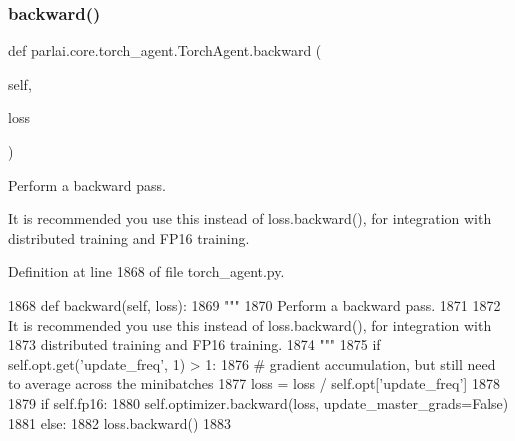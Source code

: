 \subsubsection{\texorpdfstring{backward()}{backward()}}
{\footnotesize\ttfamily def parlai.\+core.\+torch\+\_\+agent.\+Torch\+Agent.\+backward (\begin{DoxyParamCaption}\item[{}]{self,  }\item[{}]{loss }\end{DoxyParamCaption})}

\begin{DoxyVerb}Perform a backward pass.

It is recommended you use this instead of loss.backward(), for integration with
distributed training and FP16 training.
\end{DoxyVerb}
 

Definition at line 1868 of file torch\+\_\+agent.\+py.


\begin{DoxyCode}
1868     \textcolor{keyword}{def }backward(self, loss):
1869         \textcolor{stringliteral}{"""}
1870 \textcolor{stringliteral}{        Perform a backward pass.}
1871 \textcolor{stringliteral}{}
1872 \textcolor{stringliteral}{        It is recommended you use this instead of loss.backward(), for integration with}
1873 \textcolor{stringliteral}{        distributed training and FP16 training.}
1874 \textcolor{stringliteral}{        """}
1875         \textcolor{keywordflow}{if} self.opt.get(\textcolor{stringliteral}{'update\_freq'}, 1) > 1:
1876             \textcolor{comment}{# gradient accumulation, but still need to average across the minibatches}
1877             loss = loss / self.opt[\textcolor{stringliteral}{'update\_freq'}]
1878 
1879         \textcolor{keywordflow}{if} self.fp16:
1880             self.optimizer.backward(loss, update\_master\_grads=\textcolor{keyword}{False})
1881         \textcolor{keywordflow}{else}:
1882             loss.backward()
1883 
\end{DoxyCode}
\mbox{\label{classparlai_1_1core_1_1torch__agent_1_1TorchAgent_a7754a74d6c87590f46e71ec486c285a8}} 
